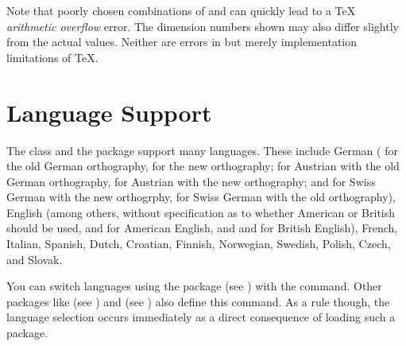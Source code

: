 Note that poorly chosen combinations of  and
 can quickly lead to a \TeX{} \emph{arithmetic overflow}
error. The dimension numbers shown may also differ slightly from the actual
values. Neither are errors in  but merely implementation
limitations of \TeX.
%
\EndIndexGroup
%
\EndIndexGroup
%
\EndIndexGroup


\section{Language Support}
%
\BeginIndexGroup
{}%

The  class and the  package support many
languages. These include German ( for
the old German orthography,  for the new orthography;
 for Austrian with the old German orthography,
 for Austrian with the
new orthography; and 
for Swiss German with the new orthogrphy,  for Swiss
German with the old orthography), English (among
others,  without specification as to whether American or
British should be used,  and  for American
English, and  and  for British English),
French, Italian,
Spanish, Dutch,
Croatian, Finnish,
Norwegian,
Swedish,
Polish,
Czech, and Slovak.

You can switch languages using the  package
(see \cite{package:babel}) with the 
command.  Other packages like  (see
\cite{package:german}) and  (see
\cite{package:ngerman}) also define this command.  As a rule though, the
language selection occurs immediately as a direct consequence of loading such
a package.
\iffalse%
For details, please refer to the documentation of the relevant packages.
\fi

